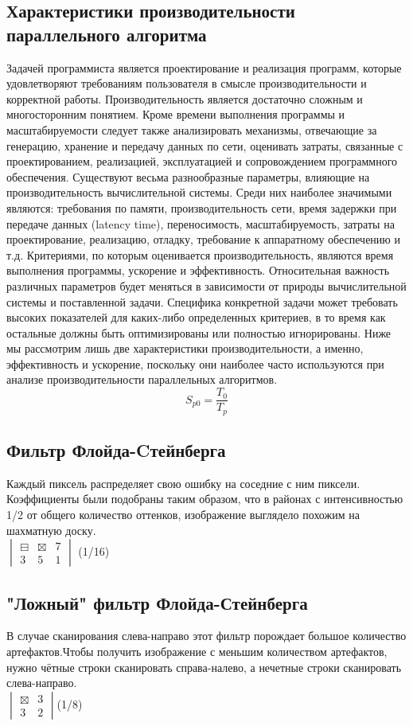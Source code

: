 \subsection{Характеристики производительности параллельного алгоритма}
Задачей программиста является проектирование и реализация программ, которые удовлетворяют требованиям пользователя в смысле производительности и корректной работы. Производительность является достаточно сложным и многосторонним понятием. Кроме времени выполнения программы и масштабируемости следует также анализировать механизмы, отвечающие за генерацию, хранение и передачу данных по сети, оценивать затраты, связанные с проектированием, реализацией, эксплуатацией и сопровождением программного обеспечения. Существуют весьма разнообразные параметры, влияющие на производительность вычислительной системы. Среди них наиболее значимыми являются: требования по памяти, производительность сети, время задержки при передаче данных (latency time), переносимость, масштабируемость, затраты на проектирование, реализацию, отладку, требование к аппаратному обеспечению и т.д. Критериями, по которым оценивается производительность, являются время выполнения программы, ускорение и эффективность.
Относительная важность различных параметров будет меняться в зависимости от природы вычислительной системы и поставленной задачи. Специфика конкретной задачи может требовать высоких показателей для каких-либо определенных критериев, в то время как остальные должны быть оптимизированы или полностью игнорированы. 
Ниже мы рассмотрим лишь две характеристики производительности, а именно, эффективность и ускорение, поскольку они наиболее часто используются при анализе производительности параллельных алгоритмов.
\begin{equation}
S_{p0} = \frac{T_{0}}{T_{p}}

\label{F:F1}
\end{equation}
\subsection{Фильтр Флойда-Cтейнберга }
Каждый пиксель распределяет свою ошибку на соседние с ним пиксели. Коэффициенты были подобраны таким образом, что в районах с  интенсивностью 1/2 от общего количество оттенков, изображение выглядело похожим на шахматную доску.\\
$  \begin{vmatrix}
\boxminus & \boxtimes & 7\\
3 & 5 & 1
\end{vmatrix}$ (1/16)
\subsection{"Ложный"  фильтр Флойда-Стейнберга }
В случае сканирования слева-направо этот фильтр порождает большое количество артефактов.Чтобы получить изображение с меньшим количеством артефактов, нужно чётные строки сканировать справа-налево, а нечетные строки сканировать слева-направо.\\
$\begin{vmatrix}
\boxtimes & 3 \\
3 & 2 
\end{vmatrix} $(1/8)

